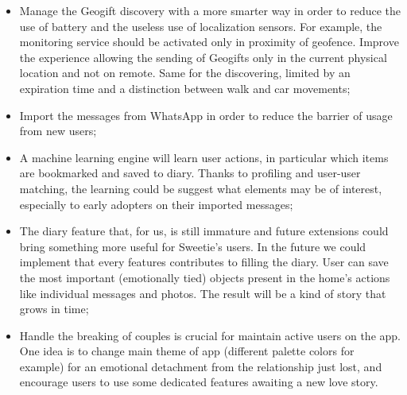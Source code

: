 \begin{itemize}
	\item Manage the Geogift discovery with a more smarter way in order to reduce the use of battery and the useless use of localization sensors. For example, the monitoring service should be activated only in proximity of geofence. Improve the experience allowing the sending of Geogifts only in the current physical location and not on remote. Same for the discovering, limited by an expiration time and a distinction between walk and car movements;
	
	\item Import the messages from WhatsApp in order to reduce the barrier of usage from new users;
	
	\item A machine learning engine will learn user actions, in particular which items are bookmarked and saved to diary. Thanks to profiling and user-user matching, the learning could be suggest what elements may be of interest, especially to early adopters on their imported messages;
	
	\item The diary feature that, for us, is still immature and future extensions could bring something more useful for Sweetie’s users. In the future we could implement that every features contributes to filling the diary. User can save the most important (emotionally tied) objects present in the home’s actions like individual messages and photos. The result will be a kind of story that grows in time;
	
	\item Handle the breaking of couples is crucial for maintain active users on the app. One idea is to change main theme of app (different palette colors for example) for an emotional detachment from the relationship just lost, and encourage users to use some dedicated features awaiting a new love story.
\end{itemize}


